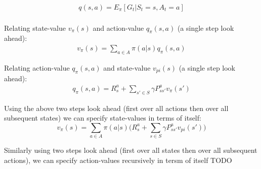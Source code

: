 \documentclass[10pt,a4paper]{article}
\begin{document}
\begin{align}
	q(s,a) = E_{\pi}[G_t | S_t = s, A_t = a]
\end{align}
\\
Relating state-value $v_{\pi}(s)$ and action-value $q_{\pi}(s,a)$ (a single step look ahead):
\begin{align}
	v_{\pi}(s) = \sum_{a \in A} \pi(a|s) q_{\pi}(s,a)
\end{align}

Relating action-value $q_{\pi}(s,a)$ and state-value $v_{pi}(s)$ (a single step look ahead):
\begin{align}
	q_{\pi}(s,a) = R_s^a + \sum_{s' \in S}\gamma P_{ss'}^a v_{\pi}(s')
\end{align}

Using the above two steps look ahead (first over all actions then over all subsequent states) we can specify state-values in terms of itself:
\begin{equation}
	v_{\pi}(s) = \sum_{a \in A} \pi(a|s) \bigg(R_s^a + \sum_{s \in S} \gamma P_{ss'}^a v_{pi}(s')\bigg) 
\end{equation}

Similarly using two steps look ahead (first over all states then over all subsequent actions), we can specify action-values recursively in tersm of itself
TODO
\end{document}

